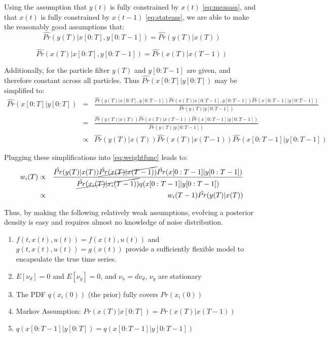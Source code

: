 Using the assumption that $y(t)$ is fully constrained by $x(t)$ \autoref{eq:measass},
and that $x(t)$ is fully constrained by $x(t-1)$ \autoref{eq:stateass}, we are able to
make the reasonably good assumptions that:
\begin{equation}
\hat{Pr}(y(T) | x[0:T], y[0:T-1]) = \hat{Pr}(y(T) | x(T))
\end{equation}

\begin{equation}
\hat{Pr}(x(T) | x[0:T], y[0:T-1]) = \hat{Pr}(x(T) | x(T-1))
\end{equation}

Additionally, for the particle filter $y(T)$ and $y[0:T-1]$ are 
given, and therefore constant across all particles. Thus $\hat{Pr}(x[0:T] | y[0:T])$
may be simplified to:
\begin{eqnarray}
\hat{Pr}(x[0:T] | y[0:T]) & = & \frac{\hat{Pr}(y(T)| x[0:T], y[0:T-1]) \hat{Pr}(x(T) | x[0:T-1], y[0:T-1]) 
            \hat{Pr}(x[0:T-1] | y[0:T-1])}{\hat{Pr}(y(T) | y[0:T-1])} \nonumber \\
& = & \frac{\hat{Pr}(y(T)| x(T)) \hat{Pr}(x(T) | x(T-1)) \hat{Pr}(x[0:T-1] | y[0:T-1])}{\hat{Pr}(y(T) | y[0:T-1])} \nonumber \\
& \propto & \hat{Pr}(y(T)| x(T)) \hat{Pr}(x(T) | x(T-1)) \hat{Pr}(x[0:T-1] | y[0:T-1])
\end{eqnarray}

Plugging these simplifications into \autoref{eq:weightfunc} leads to:
\begin{eqnarray}
w_i(T) & \propto & \frac{\hat{Pr}(y(T)| x(T)) \cancel{\hat{Pr}(x(T) | x(T-1))} \hat{Pr}(x[0:T-1] | y[0:T-1])}
                         {\cancel{\hat{Pr}(x_i(T) | x_i(T-1))}q(x[0:T-1] | y[0:T-1])} \nonumber \\
& \propto & w_i(T-1)\hat{Pr}(y(T)| x(T)) 
\label{eq:weightevolve}
\end{eqnarray}

Thus, by making the following relatively weak assumptions, evolving a posterior
density  is easy and requires almost no knowledge of noise distribution.
\begin{enumerate}
\item $f(t, x(t), u(t)) = f(x(t), u(t))$ and $g(t, x(t), u(t)) = g(x(t))$ provide 
a sufficiently flexible model to encapsulate the true time series.
\item $E[\nu_d] = 0$ and $E[\nu_y] = 0$, and $\nu_x = d\nu_d$, $\nu_y$ are stationary
\item The PDF $q(x_i(0))$ (the prior) fully covers $Pr(x_i(0))$
\item Markov Assumption: $Pr(x(T) | x[0:T]) = Pr(x(T) | x(T-1))$
\item $q(x[0:T-1] | y[0:T]) = q(x[0:T-1] | y[0:T-1])$
\end{enumerate}

